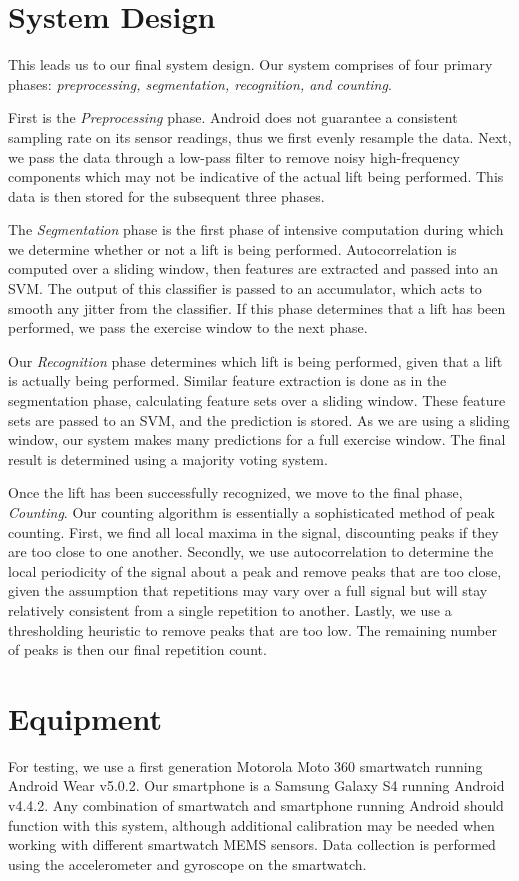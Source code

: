 \section{System Design}

This leads us to our final system design. Our system comprises of four primary phases: \textit{preprocessing, segmentation, recognition, and counting}. 

First is the \textit{Preprocessing} phase. Android does not guarantee a consistent sampling rate on its sensor readings, thus we first evenly resample the data. Next, we pass the data through a low-pass filter to remove noisy high-frequency components which may not be indicative of the actual lift being performed. This data is then stored for the subsequent three phases.

The \textit{Segmentation} phase is the first phase of intensive computation during which we determine whether or not a lift is being performed. Autocorrelation is computed over a sliding window, then features are extracted and passed into an SVM. The output of this classifier is passed to an accumulator, which acts to smooth any jitter from the classifier. If this phase determines that a lift has been performed, we pass the exercise window to the next phase.

Our \textit{Recognition} phase determines which lift is being performed, given that a lift is actually being performed. Similar feature extraction is done as in the segmentation phase, calculating feature sets over a sliding window. These feature sets are passed to an SVM, and the prediction is stored. As we are using a sliding window, our system makes many predictions for a full exercise window. The final result is determined using a majority voting system.

Once the lift has been successfully recognized, we move to the final phase, \textit{Counting}. Our counting algorithm is essentially a sophisticated method of peak counting. First, we find all local maxima in the signal, discounting peaks if they are too close to one another. Secondly, we use autocorrelation to determine the local periodicity of the signal about a peak and remove peaks that are too close, given the assumption that repetitions may vary over a full signal but will stay relatively consistent from a single repetition to another. Lastly, we use a thresholding heuristic to remove peaks that are too low. The remaining number of peaks is then our final repetition count. 

\section{Equipment}

For testing, we use a first generation Motorola Moto 360 smartwatch running Android Wear v5.0.2. Our smartphone is a Samsung Galaxy S4 running Android v4.4.2. Any combination of smartwatch and smartphone running Android should function with this system, although additional calibration may be needed when working with different smartwatch MEMS sensors. Data collection is performed using the accelerometer and gyroscope on the smartwatch.